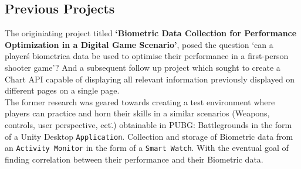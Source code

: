     \subsection*{Previous Projects}
    The originiating project titled \textbf{`Biometric Data Collection for Performance Optimization in a Digital
    Game Scenario'}, posed the question `can a player\'s biometrica data be used to optimise their performance in a 
    first-person shooter game'? And a subsequent follow up project which sought to create a Chart API capable of displaying 
    all relevant information previously displayed on different pages on a single page.\\
    The former research was geared towards creating a test environment where players can 
    practice and horn their skills in a similar scenarios (Weapons, controls, user perspective, ect\..) obtainable in PUBG\:: 
    Battlegrounds in the form of a Unity Desktop {\tt Application}. Collection and storage of Biometric data from an 
    {\tt Activity Monitor} in the form of a {\tt Smart Watch}. With the eventual goal of finding correlation between their
    performance and their Biometric data. 


    
